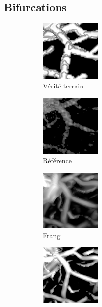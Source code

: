 \subsection{Bifurcations}

\begin{figure}[!ht]
  \centering
      \begin{subfigure}[t]{0.30\textwidth}
        \includegraphics[clip = true, trim  = 0 50 0 80, width=30mm]{Images/Ircad_k_GT.png}
        \caption{Vérité terrain}
      \end{subfigure}
      \begin{subfigure}[t]{0.30\textwidth}
        \includegraphics[clip = true, trim  = 0 50 0 80, width=30mm]{Images/Ircad_k_Baseline.png}
        \caption{Référence}
      \end{subfigure}
      \begin{subfigure}[t]{0.30\textwidth}
        \includegraphics[clip = true, trim  = 0 50 0 80, width=30mm]{Images/Ircad_k_Frangi.png}
        \caption{Frangi}
      \end{subfigure}
      \begin{subfigure}[t]{0.30\textwidth}
        \includegraphics[clip = true, trim  = 0 50 0 80, width=30mm]{Images/Ircad_k_Jerman.png}

\end{subfigure}
\end{figure}
